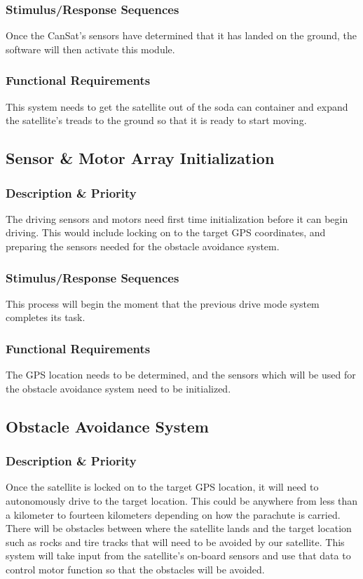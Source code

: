 \documentclass[10pt,onecolumn,draftclsnofoot,document]{IEEEtran}
\begin{document}
\subsubsection{Stimulus/Response Sequences}
Once the CanSat's sensors have determined that it has landed on the ground, the software will then activate this module.

\subsubsection{Functional Requirements}
This system needs to get the satellite out of the soda can container and expand the satellite's treads to the ground so that it is ready to start moving.

\subsection{Sensor \& Motor Array Initialization}

\subsubsection{Description \& Priority}
The driving sensors and motors need first time initialization before it can begin driving. This would include locking on to the target GPS coordinates, and preparing the sensors needed for the obstacle avoidance system.

\subsubsection{Stimulus/Response Sequences}
This process will begin the moment that the previous drive mode system completes its task. 

\subsubsection{Functional Requirements}
The GPS location needs to be determined, and the sensors which will be used for the obstacle avoidance system need to be initialized. 

\subsection{Obstacle Avoidance System}

\subsubsection{Description \& Priority}
Once the satellite is locked on to the target GPS location, it will need to autonomously drive to the target location. This could be anywhere from less than a kilometer to fourteen kilometers depending on how the parachute is carried. There will be obstacles between where the satellite lands and the target location such as rocks and tire tracks that will need to be avoided by our satellite. This system will take input from the satellite's on-board sensors and use that data to control motor function so that the obstacles will be avoided.
\end{document}
